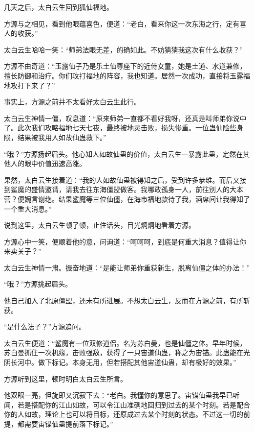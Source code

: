 
\begin{this_body}

几天之后，太白云生回到狐仙福地。

方源与之相见，看到他眼蕴喜色，便道：“老白，看来你这一次东海之行，定有喜人的收获。”

太白云生哈哈一笑：“师弟法眼无差，的确如此。不妨猜猜我这次有什么收获？”

方源不由奇道：“玉露仙子乃是乐土仙尊座下的近侍女童，她是土道、水道兼修，擅长防御和治疗。你们攻打福地的阵容，我也知道。居然一次成功，直接将玉露福地攻打下来了？”

事实上，方源之前并不太看好太白云生此行。

太白云生神情一僵，叹息道：“原来师弟一直都不看好我呀，还真是叫师弟你说中了。此次我们攻略福地七天七夜，最终被地灵击败，损失惨重。一位蛊仙险些身陨，结果被我用人如故仙蛊救下。”

“哦？”方源扬起眉头。他心知人如故仙蛊的价值，太白云生一暴露此蛊，定然在其他人的眼中价值迅速高涨。

果然，太白云生接着道：“我的人如故仙蛊被得知之后，受到许多恭维。而后又接到鲨魔的盛情邀请，请我去往东海僵盟做客。我哪敢孤身一人，前往别人的大本营？便婉言谢绝。结果鲨魔等三位仙僵，在海市福地款待了我，酒席间让我得知了一个重大消息。”

说到这里，太白云生顿了顿，止住话头，目光炯炯地看着方源。

方源心中一笑，便顺着他的意，问询道：“呵呵呵，到底是何重大消息？值得让你来卖关子？”

太白云生神情一肃。振奋地道：“是能让师弟你重获新生，脱离仙僵之体的办法！”

“哦？”方源挑起眉头。

他自己加入了北原僵盟，还未有所进展。不想太白云生，反而在方源之前，有所斩获。

“是什么法子？”方源追问。

太白云生便道：“鲨魔有一位双修道侣。名为苏白曼，也是仙僵之体。早年时候，苏白曼抓住一次机缘，击败强敌，获得了一只宙道仙蛊，称之为宙锚。此蛊能在光阴长河中。做下标记。本身无用，但若搭配其他宙道仙蛊，却有极好的效果。”

方源听到这里，顿时明白太白云生所言。

他双眼一亮，但旋即又沉寂下去：“老白。我懂你的意思了。宙锚仙蛊我早已听闻，若是搭配你的江山如故，可以令江山准确地回归到过去的某个时刻。若是配合你的人如故，理论上也可以将目标，还原成过去某个时刻的状态。不过这一切的前提，都需要宙锚仙蛊提前落下标记。”


\end{this_body}
